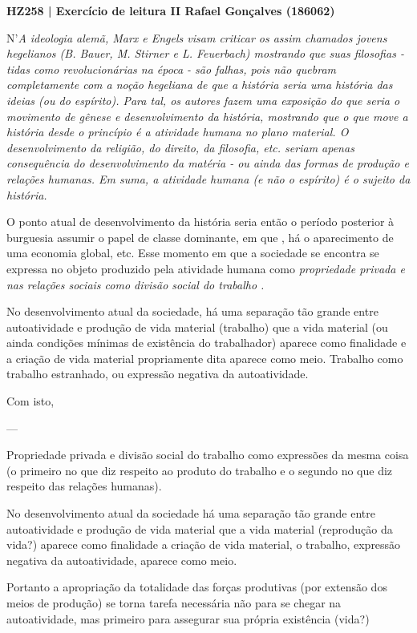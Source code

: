 \documentclass[12pt]{article}
\begin{document}
\noindent
\large\textbf{HZ258 | Exercício de leitura II \hfill Rafael Gonçalves (186062)}
\break\hfill

N'\em A ideologia alemã\em, Marx e Engels visam criticar os assim chamados jovens hegelianos (B. Bauer, M. Stirner e L. Feuerbach) mostrando que suas filosofias - tidas como revolucionárias na época - são falhas, pois não quebram completamente com a noção hegeliana de que a história seria uma história das ideias (ou do espírito).
Para tal, os autores fazem uma exposição do que seria o movimento de gênese e desenvolvimento da história, mostrando que o que move a história desde o princípio é a \em atividade humana \em no plano material.
O desenvolvimento da religião, do direito, da filosofia, etc. seriam apenas consequência do desenvolvimento da matéria - ou ainda das formas de produção e relações humanas. Em suma, a atividade humana (e não o espírito) é o sujeito da história.

O ponto atual de desenvolvimento da história seria então o período posterior à burguesia assumir o papel de classe dominante, em que , há o aparecimento de uma economia global, etc. %
Esse momento em que a sociedade se encontra se expressa no objeto produzido pela atividade humana como \em propriedade privada \em e nas relações sociais como \em divisão social do trabalho \em.

No desenvolvimento atual da sociedade, há uma separação tão grande entre autoatividade e produção de vida material (trabalho) que a vida material (ou ainda condições mínimas de existência do trabalhador) aparece como finalidade e a criação de vida material propriamente dita aparece como meio.
Trabalho como trabalho estranhado, ou expressão negativa da autoatividade.

Com isto, 

--- 

Propriedade privada e divisão social do trabalho como expressões da mesma coisa (o primeiro no que diz respeito ao produto do trabalho e o segundo no que diz respeito das relações humanas).

No desenvolvimento atual da sociedade há uma separação tão grande entre autoatividade e produção de vida material que a vida material (reprodução da vida?) aparece como finalidade a criação de vida material, o trabalho, expressão negativa da autoatividade, aparece como meio.

Portanto a apropriação da totalidade das forças produtivas (por extensão dos meios de produção) se torna tarefa necessária não para se chegar na autoatividade, mas primeiro para assegurar sua própria existência (vida?)
\end{document}
